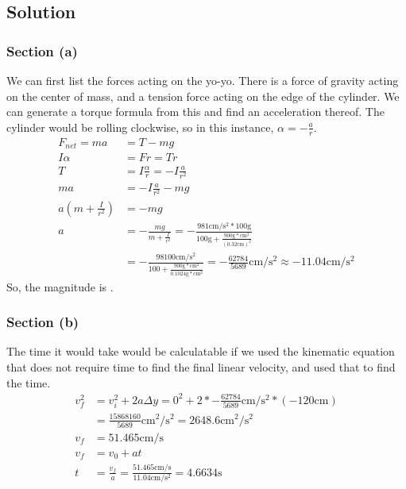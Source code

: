 \documentclass[12pt]{article}
\begin{document}
\subsection{Solution}
\subsubsection{Section (a)}
We can first list the forces acting on the yo-yo. There is a force of gravity acting on the center of mass, and a tension force acting on the edge of the cylinder. We can generate a torque formula from this and find an acceleration thereof. The cylinder would be rolling clockwise, so in this instance, \(\alpha = -\frac{a}{r}\). 
\begin{align}
    F_{net} = ma
        &=  T - mg\\
    I\alpha &=  Fr
        =   Tr\\
    T   &=  I\frac{\alpha}{r}
        =   -I\frac{a}{r^2}\\
    ma  &=  -I\frac{a}{r^2} - mg\\
    a\left(m + \frac{I}{r^2}\right) &=  -mg\\
    a   &=  -\frac{mg}{m + \frac{I}{r^2}}
        =   -\frac{981\unit{\centi\meter/\second^2}*100\unit{\gram}}{100\unit{\gram} + \frac{900\unit{\gram*\centi\meter^2}}{(0.32\unit{\centi\meter})^2}}\\
        &=  -\frac{98100\unit{\centi\meter/\second^2}}{100 + \frac{900\unit{\gram*\centi\meter^2}}{0.1024\unit{\gram*\centi\meter^2}}}
        =   -\frac{62784}{5689}\unit{\centi\meter/\second^2} \approx -11.04\unit{\centi\meter/\second^2}
\end{align}
So, the magnitude is .

\subsubsection{Section (b)}
The time it would take would be calculatable if we used the kinematic equation that does not require time to find the final linear velocity, and used that to find the time.
\begin{align}
    v_f^2   &=  v_i^2 + 2a\Delta y
        =   0^2 + 2*-\frac{62784}{5689}\unit{\centi\meter/\second^2}*(-120\unit{\centi\meter})\\
        &=  \frac{15868160}{5689}\unit{\centi\meter^2/\second^2}
        =   2648.6\unit{\centi\meter^2/\second^2}\\
    v_f &=  51.465\unit{\centi\meter/\second}\\
    v_f &=  v_0 + at\\
    t   &=  \frac{v_f}{a}
        =   \frac{51.465\unit{\centi\meter/\second}}{11.04\unit{\centi\meter/\second^2}}
        =   \boxed{4.6634\unit{\second}}
\end{align}
\end{document}
